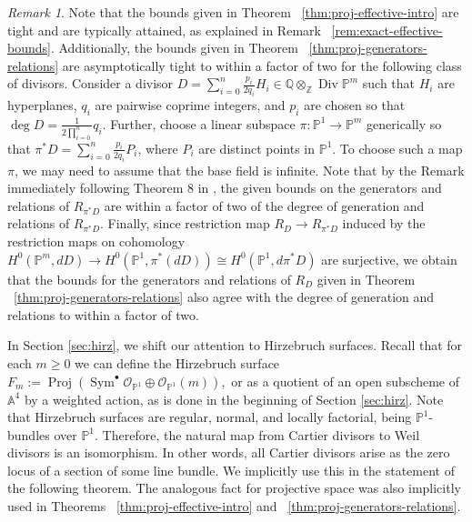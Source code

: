\documentclass{amsart}
\theoremstyle{plain}
\theoremstyle{definition}
\theoremstyle{remark}
\newtheorem{rem}[thm]{Remark}
\numberwithin{equation}{section}
\newcommand\bq{{\mathbb Q}}
\newcommand\bp{{\mathbb P}}
\newcommand\bz{{\mathbb Z}}
\newcommand\ba{{\mathbb A}}
\newcommand\sco{{\mathscr O}}
\DeclareMathOperator{\sym}{Sym}
\DeclareMathOperator\di{Div}
\DeclareMathOperator{\proj}{Proj}
\begin{document}
\begin{rem}\label{rem:proj-tight-bounds} Note that the bounds
	given in Theorem ~\ref{thm:proj-effective-intro}
are tight and are typically attained, as explained in
Remark ~\ref{rem:exact-effective-bounds}.
Additionally, the bounds given in Theorem 
~\ref{thm:proj-generators-relations} are asymptotically
tight to within a factor of two 
for the following class of divisors. Consider
a divisor 
$ D = \sum_{i=0}^n\frac{p_i}{2q_i}H_i \in \bq \otimes_\bz \di \bp^m$
such that $H_i$ are hyperplanes,  
$q_i$ are pairwise coprime integers, and $p_i$ are chosen
so that $\deg D = \frac{1}{2 \prod_{i=0}^n}q_i$. Further,
choose a linear subspace $\pi: \bp^1 \rightarrow \bp^m$  generically so that
$\pi^* D = \sum_{i=0}^n \frac{p_i}{2q_i}P_i$, 
where $P_i$ are distinct points in $\bp^1$. To choose such a map
$\pi$, we may need to assume that the base field is infinite.
Note that by the Remark immediately following Theorem 8 in 
\cite{dorney:canonical},
the given bounds on the generators and relations of
$R_{\pi^*D}$ are within
a factor of two of the degree of generation and relations of
$R_{\pi^*D}$. Finally, since restriction map
$R_D \rightarrow R_{\pi^*D}$ induced by the restriction maps
on cohomology $H^0(\bp^m, dD) \rightarrow H^0(\bp^1, \pi^*(dD))
\cong H^0(\bp^1, d\pi^* D)$ are surjective, we obtain that
the bounds for the generators and relations of $R_D$ given in
Theorem ~\ref{thm:proj-generators-relations} also
agree with the degree of generation and relations 
to within a factor of two.
 \end{rem}

In Section \ref{sec:hirz}, we shift our attention to Hirzebruch surfaces. Recall that for each $m \geq 0$ we can define the
Hirzebruch surface $F_m := \proj(\sym^\bullet \sco_{\bp^1} \oplus
\sco_{\bp^1}(m)),$ or as a quotient of an open subscheme of
$\ba^4$ by a 
weighted action, as is done in the
beginning of Section \ref{sec:hirz}.
Note that Hirzebruch surfaces are regular, normal,
and locally factorial, being $\bp^1$-bundles over
$\bp^1$. Therefore, the natural map from Cartier
divisors to Weil divisors is an isomorphism.
In other words, all Cartier divisors arise as the zero locus
of a section of some line bundle. We implicitly use this in the
statement of the following theorem. The analogous fact for
projective space was also implicitly used in Theorems
~\ref{thm:proj-effective-intro} and ~\ref{thm:proj-generators-relations}.
\end{document}
